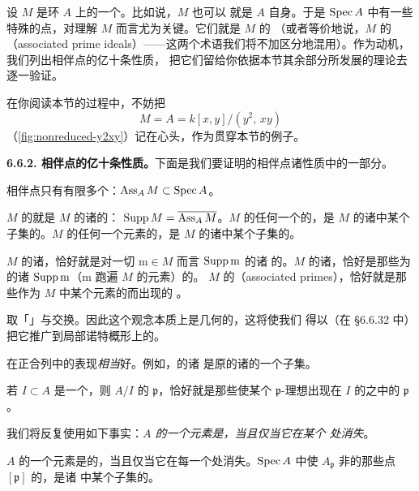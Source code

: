 设 $M$ 是\trNoetherian{}环 $A$ 上的一个\trFinitelyGenerated{}\trModule。比如说，$M$ 也可以
就是 $A$ 自身。于是 $\operatorname{Spec} A$ 中有一些特殊的点，对理解 $M$ 而言尤为关键。它们就是 $M$ 的%
\emph{\trAssociatedPoint}（或者等价地说，$M$ 的\emph{\trAssociatedPrimeIdeal{}}（associated prime
ideals）——这两个术语我们将不加区分地混用）。作为动机，我们列出相伴点的亿十条性质，
把它们留给你依据本节其余部分所发展的理论去逐一验证。

在你阅读本节的过程中，不妨把
\[
M=A=k[x,y]/(y^2,\,xy)
\]
（\cref{fig:nonreduced-y2xy}）记在心头，作为贯穿本节的例子。

\textbf{6.6.2. 相伴点的亿十条性质。}\quad 下面是我们要证明的相伴点诸性质中的一部分。

相伴点只有有限多个：$\operatorname{Ass}_A M\subset\operatorname{Spec} A$。

$M$ 的\trSupport{}就是 $M$ 的诸\trAssociatedPoint{}的\trClosure：%
$\operatorname{Supp} M=\overline{\operatorname{Ass}_A M}$。$M$ 的任何一个\trSubmodule{}的\trSupport，是
$M$ 的诸\trAssociatedPoint{}中某个子集的\trClosure。$M$ 的任何一个元素的\trSupport，是
$M$ 的诸\trAssociatedPoint{}中某个子集的\trClosure。

$M$ 的诸\trAssociatedPoint，恰好就是对一切 $\mathrm{m}\in M$ 而言 $\operatorname{Supp}\mathrm{m}$ 的诸%
\trIrreducibleComponent{}的\trGenericPoint。$M$ 的诸\trAssociatedPoint，恰好是那些为%
\trIrreducible{}的诸 $\operatorname{Supp}\mathrm{m}$（$\mathrm{m}$ 跑遍 $M$ 的元素）的\trGenericPoint。%
$M$ 的\trAssociatedPrimeIdeal{}（associated primes），恰好就是那些作为 $M$ 中某个元素的\trAnnihilatorIdeal{}而出现的%
\trPrimeIdeal。

取「\trAssociatedPoint」与\trLocalization{}交换。因此这个观念本质上是几何的，这将使我们
得以（在 \S6.6.32 中）把它推广到局部诺特概形上的\trCoherentSheaf。

\trAssociatedPoint{}在正合列中的表现\emph{相当}好。例如，\trSubmodule{}的诸%
\trAssociatedPoint{}是原\trModule{}的诸\trAssociatedPoint{}的一个子集。

若 $I\subset A$ 是一个\trIdeal，则 $A/I$ 的\trAssociatedPrimeIdeal{} $\mathfrak{p}$，恰好就是那些使某个%
$\mathfrak{p}$-\trPrimary{}理想出现在 $I$ 的\trPrimaryDecomposition{}之中的 $\mathfrak{p}$。

我们将反复使用如下事实：\emph{$A$ 的一个元素是\trZerodivisor，当且仅当它在某个%
\trAssociatedPoint{}处消失}。

$A$ 的一个元素是\trNilpotent{}的，当且仅当它在每一个\trAssociatedPoint{}处消失。$\operatorname{Spec} A$
中使\trStalk{} $A_{\mathfrak{p}}$ 非\trReduced{}的那些点 $[\mathfrak{p}]$ 的\trLocus，是诸%
\trAssociatedPoint{}中某个子集的\trClosure。

